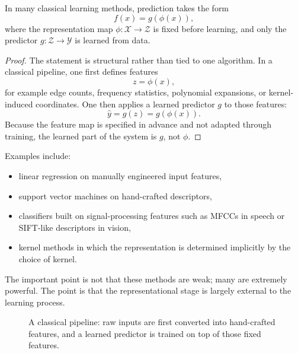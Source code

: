 \begin{proposition}
In many classical learning methods, prediction takes the form
\[
f(x)=g(\phi(x)),
\]
where the representation map $\phi:\mathcal X\to\mathcal Z$ is fixed before learning, and only the predictor $g:\mathcal Z\to\mathcal Y$ is learned from data.
\end{proposition}

\begin{proof}
The statement is structural rather than tied to one algorithm. In a classical pipeline, one first defines features
\[
z=\phi(x),
\]
for example edge counts, frequency statistics, polynomial expansions, or kernel-induced coordinates. One then applies a learned predictor $g$ to those features:
\[
\hat y = g(z)=g(\phi(x)).
\]
Because the feature map is specified in advance and not adapted through training, the learned part of the system is $g$, not $\phi$.
\end{proof}

Examples include:

\begin{itemize}
    \item linear regression on manually engineered input features,
    \item support vector machines on hand-crafted descriptors,
    \item classifiers built on signal-processing features such as MFCCs in speech or SIFT-like descriptors in vision,
    \item kernel methods in which the representation is determined implicitly by the choice of kernel.
\end{itemize}

The important point is not that these methods are weak; many are extremely powerful. The point is that the representational stage is largely external to the learning process.

\begin{figure}[tbp]
\centering
{}
\caption{A classical pipeline: raw inputs are first converted into hand-crafted features, and a learned predictor is trained on top of those fixed features.}
\end{figure}

